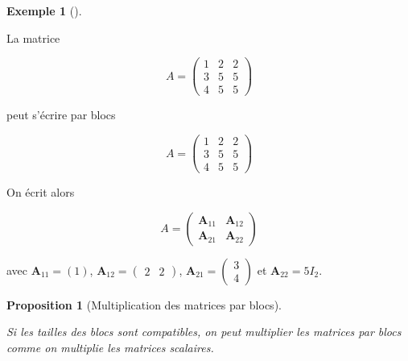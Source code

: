 \documentclass[
  french,
  letterpaper,
  DIV=11,
  numbers=noendperiod]{scrreprt}
\theoremstyle{plain}
\theoremstyle{definition}
\theoremstyle{plain}
\newtheorem{proposition}{Proposition}[chapter]
\theoremstyle{plain}
\theoremstyle{definition}
\theoremstyle{definition}
\newtheorem{example}{Exemple}[chapter]
\theoremstyle{plain}
\theoremstyle{remark}
\begin{document}
\begin{example}[]\protect\hypertarget{exm-blocs}{}\label{exm-blocs}

La matrice

\[
A = \begin{pmatrix}
   1&2&2\\
3 &5&5\\
4 &5&5
\end{pmatrix}
\]

peut s'écrire par blocs

\[
A = \left(\begin{array}{c|cc}
   1&2&2\\
\hline
3 &5&5\\
4 &5&5
\end{array}\right)
\]

On écrit alors

\[
    A = \begin{pmatrix}
        \boldsymbol{A}_{11} & \boldsymbol{A}_{12}\\
\boldsymbol{A}_{21} & \boldsymbol{A}_{22}
    \end{pmatrix}
\]

avec \(\boldsymbol{A}_{11} = (1)\),
\(\boldsymbol{A}_{12} = \begin{pmatrix}
    2&2
\end{pmatrix}\), \(\boldsymbol{A}_{21} = \begin{pmatrix}
    3\\4
\end{pmatrix}\) et \(\boldsymbol{A}_{22} = 5 I_{2}\).

\end{example}

\begin{proposition}[Multiplication des matrices par
blocs]\protect\hypertarget{prp-multiplication}{}\label{prp-multiplication}

Si les tailles des blocs sont compatibles, on peut multiplier les
matrices par blocs comme on multiplie les matrices scalaires.

\end{proposition}
\end{document}
